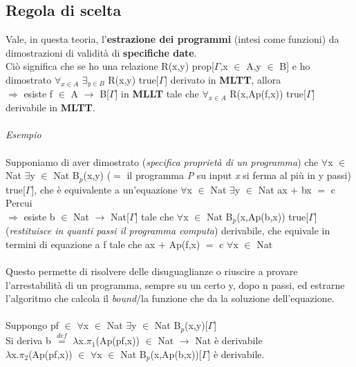 \subsection{Regola di scelta}
\label{subsec:regola-di-scelta}
Vale, in questa teoria, l'\textbf{estrazione dei programmi} (intesi come funzioni) da dimostrazioni di validit\`a di \textbf{specifiche date}.\\ Ci\`o significa che se ho una relazione R(x,y) prop[$\Gamma$,x $\in$ A,y $\in$ B] e ho dimostrato $\forall_{x \in A}$ $\exists_{y \in B}$ R(x,y) true[$\Gamma$] derivato in \textbf{MLTT}, allora\\
$\Rightarrow$ esiste f $\in$ A $\rightarrow$ B[$\Gamma$] in \textbf{MLLT} tale che $\forall_{x \in A}$ R(x,Ap(f,x)) true[$\Gamma$] derivabile in \textbf{MLTT}.
\\\\
\noindent
\textit{Esempio}\\\\
\noindent
Supponiamo di aver dimostrato (\textit{specifica propriet\`a di un programma}) che $\forall$x $\in$ Nat $\exists$y $\in$ Nat B$_p$(x,y) ($=$ il programma \textit{P} su input \textit{x} si ferma al pi\`u in y passi) true[$\Gamma$], che \`e equivalente a un'equazione $\forall$x $\in$ Nat $\exists$y $\in$ Nat  ax $+$ bx $=$ c\\
Percui\\
$\Rightarrow$ esiste b $\in$ Nat $\rightarrow$ Nat[$\Gamma$] tale che $\forall$x $\in$ Nat B$_p$(x,Ap(b,x)) true[$\Gamma$] (\textit{restituisce in quanti passi il programma computa}) derivabile, che equivale in termini di equazione a f tale che ax $+$ Ap(f,x) $=$ c $\forall$x $\in$ Nat\\\\
\noindent
Questo permette di risolvere delle disuguaglianze o riuscire a provare l'arrestabilit\`a di un programma, sempre su un certo y, dopo n passi, ed estrarne l'algoritmo che calcola il \textit{bound}/la funzione che da la soluzione dell'equazione.\\\\
\noindent
Suppongo pf $\in$ $\forall$x $\in$ Nat $\exists$y $\in$ Nat B$_p$(x,y)[$\Gamma$]\\
Si deriva b ${\overset{\mathit{def}}{=}}$ $\lambda$x.$\pi_1$(Ap(pf,x)) $\in$ Nat $\rightarrow$ Nat \`e derivabile\\  $\lambda$x.$\pi_2$(Ap(pf,x)) $\in$ $\forall$x $\in$ Nat B$_p$(x,Ap(b,x))[$\Gamma$] \`e derivabile.

